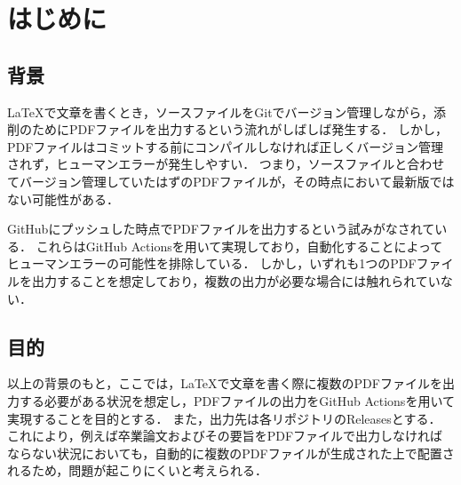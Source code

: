 \section{はじめに}
\label{pre}
\hspace{1zw}


\subsection{背景}


\LaTeX で文章を書くとき，ソースファイルをGitでバージョン管理しながら，添削のためにPDFファイルを出力するという流れがしばしば発生する．
しかし，PDFファイルはコミットする前にコンパイルしなければ正しくバージョン管理されず，ヒューマンエラーが発生しやすい．
つまり，ソースファイルと合わせてバージョン管理していたはずのPDFファイルが，その時点において最新版ではない可能性がある．

GitHubにプッシュした時点でPDFファイルを出力するという試みがなされている\cite{raven38,denkiuo604,takuseno}．
これらはGitHub Actions\cite{github-actions}を用いて実現しており，自動化することによってヒューマンエラーの可能性を排除している．
しかし，いずれも1つのPDFファイルを出力することを想定しており，複数の出力が必要な場合には触れられていない．

\subsection{目的}

以上の背景のもと，ここでは，\LaTeX で文章を書く際に複数のPDFファイルを出力する必要がある状況を想定し，PDFファイルの出力をGitHub Actionsを用いて実現することを目的とする．
また，出力先は各リポジトリのReleasesとする．
これにより，例えば卒業論文およびその要旨をPDFファイルで出力しなければならない状況においても，自動的に複数のPDFファイルが生成された上で配置されるため，問題が起こりにくいと考えられる．